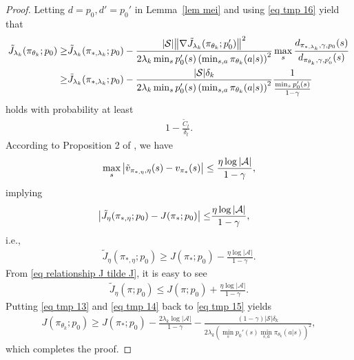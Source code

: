 \documentclass[twoside,11pt]{article}
\newcommand{\fS}{\mathcal{S}}
\newcommand{\fA}{\mathcal{A}}
\newcommand{\ns}{{|\fS|}}
\newcommand{\na}{{|\fA|}}
\numberwithin{assucounter}{section}
\begin{document}
\begin{proof}
  Letting $d=p_0, d'=p_0'$ in Lemma~\ref{lem mei} and using \eqref{eq tmp 16} yield that
  \begin{align}
    \tilde J_{\lambda_k}(\pi_{\theta_k}; p_0) \geq& \tilde J_{\lambda_k}(\pi_{*, \lambda_k}; p_0) - \frac{\ns \norm{\nabla \tilde J_{\lambda_k}(\pi_{\theta_k}; p_0')}^2}{2\lambda_k \min_s p_0'(s) \left(\min_{s, a} \pi_{\theta_k}(a|s)\right)^2} \max_s \frac{d_{\pi_{*, \lambda_k}, \gamma, p_0}(s)}{d_{\pi_{\theta_k}, \gamma, p_0'}(s)} \\
    \label{eq tmp 15}
    \geq& \tilde J_{\lambda_k}(\pi_{*, \lambda_k}; p_0) - \frac{\ns \delta_k}{2\lambda_k \min_s p_0'(s)\left( \min_{s, a} \pi_{\theta_k}(a|s)\right)^2} \frac{1}{\frac{\min_s p_0'(s)}{1-\gamma}}
  \end{align}
  holds with probability at least
  \begin{align}
    1 - \frac{\tilde C_t}{\delta_t}.
  \end{align}
  According to Proposition 2 of \citet{dai2017sbeed},
  we have 
  \begin{align}
    \max_s \abs{\tilde v_{\pi_{*, \eta}, \eta}(s) - v_{\pi_*}(s)} \leq \frac{\eta \log \na}{1 - \gamma},
  \end{align}
  implying
  \begin{align}
    \abs{\tilde J_\eta(\pi_{*, \eta};p_0) - J(\pi_*; p_0)} \leq& \frac{\eta \log \na}{1 - \gamma}, 
  \end{align}
  i.e.,
  \begin{align}
    \label{eq tmp 13}
    \tilde J_\eta(\pi_{*, \eta}; p_0) \geq J(\pi_*; p_0) - \frac{\eta \log \na}{1 - \gamma}.
  \end{align}
  From \eqref{eq relationship J tilde J},
  it is easy to see
  \begin{align}
    \label{eq tmp 14}
    \tilde J_\eta(\pi; p_0) \leq J(\pi; p_0) + \frac{\eta \log \na}{1 - \gamma}.
  \end{align}
  Putting \eqref{eq tmp 13} and \eqref{eq tmp 14} back to \eqref{eq tmp 15} yields
  \begin{align}
    J(\pi_{\theta_k};p_0) \geq J(\pi_*; p_0) - \frac{2\lambda_k \log\na}{1 - \gamma} - \frac{(1 - \gamma)\ns \delta_k}{2\lambda_k \left(\min_s p_0'(s) \min_{s, a} \pi_{\theta_k}(a|s)\right)^2},
  \end{align}
  which completes the proof.
\end{proof}
\end{document}
